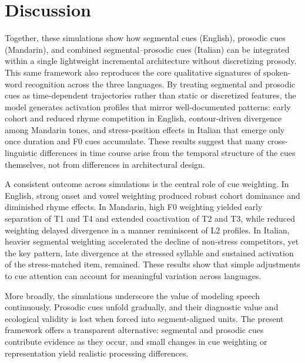 \section{Discussion}

Together, these simulations show how segmental cues (English), prosodic cues (Mandarin), and combined segmental–prosodic cues (Italian) can be integrated within a single lightweight incremental architecture without discretizing prosody. This same framework also reproduces the core qualitative signatures of spoken-word recognition across the three languages. By treating segmental and prosodic cues as time-dependent trajectories rather than static or discretized features, the model generates activation profiles that mirror well-documented patterns: early cohort and reduced rhyme competition in English, contour-driven divergence among Mandarin tones, and stress-position effects in Italian that emerge only once duration and F0 cues accumulate. These results suggest that many cross-linguistic differences in time course arise from the temporal structure of the cues themselves, not from differences in architectural design.

A consistent outcome across simulations is the central role of cue weighting. In English, strong onset and vowel weighting produced robust cohort dominance and diminished rhyme effects. In Mandarin, high F0 weighting yielded early separation of T1 and T4 and extended coactivation of T2 and T3, while reduced weighting delayed divergence in a manner reminiscent of L2 profiles. In Italian, heavier segmental weighting accelerated the decline of non-stress competitors, yet the key pattern, late divergence at the stressed syllable and sustained activation of the stress-matched item, remained. These results show that simple adjustments to cue attention can account for meaningful variation across languages.

More broadly, the simulations underscore the value of modeling speech continuously. Prosodic cues unfold gradually, and their diagnostic value and ecological validity is lost when forced into segment-aligned units. The present framework offers a transparent alternative: segmental and prosodic cues contribute evidence as they occur, and small changes in cue weighting or representation yield realistic processing differences.